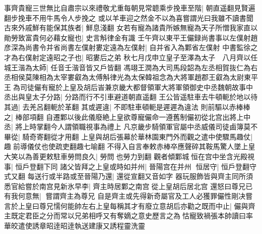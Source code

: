 事齊貴寵三世無比自肅宗以來禮敬尤重每朝見常聼乘步挽車至階|{
	朝直遥翻見賢遍翻步挽車不用牛馬令人步挽之}
或以羊車迎之然金不以為喜嘗謂光曰我雖不讀書聞古來外戚鮮有能保其族者|{
	鮮息淺翻}
女若有寵為諸貴所嫉無寵為天子所憎我家直以勛勞致富貴何必藉女寵也|{
	史言斛律金有識}
壬午齊以東平王儼録尚書事以左僕射趙彦深為尚書令并省尚書左僕射婁定遠為左僕射|{
	自并省入為鄴省左僕射}
中書監徐之才為右僕射定遠昭之子也|{
	昭婁后之弟}
秋七月戊申立皇子至澤為太子　八月齊以任城王湝為太師|{
	任音壬湝音皆又戶皆翻}
馮翊王潤為大司馬段韶為左丞相賀抜仁為右丞相侯莫陳相為太宰婁叡為太傅斛律光為太保韓祖念為大將軍趙郡王叡為太尉東平王為司徒儼有寵於上皇及胡后峕兼京畿大都督領軍大將軍領御史中丞魏朝故事中丞出與皇太子分路|{
	分路而行不引車避道朝直遥翻}
王公皆遥駐車去牛頓軛於地以待其過|{
	去羌呂翻軛於革翻}
其或遲違|{
	不即駐車頓軛是遲遲為違法}
則前驅以赤棒棒之|{
	棒部項翻}
自遷鄴以後此儀廢絶上皇欲尊寵儼命一遵舊制儼初從北宫出將上中丞|{
	將上時掌翻今人謂領職視事為禮上}
凡京畿步騎領軍官屬中丞威儀司徒鹵簿莫不畢從|{
	騎奇寄翻從才用翻}
上皇與胡后張幕於華林園東門外而觀之遣中使驟馬趣仗|{
	趣前導儀仗也使疏吏翻趣七喻翻}
不得入自言奉敕赤棒卒應聲碎其鞍馬驚人墜上皇大笑以為善更敕駐車勞問良久|{
	勞問也勞力到翻}
觀者傾鄴城恒在宫中坐含光殿視事|{
	恒戶登翻下同}
諸父皆拜之上皇或時如并州|{
	晉陽宫在并州}
恒居守|{
	恒戶登翻守式又翻}
每送行或半路或至晉陽乃還|{
	還從宣翻又音如字}
器玩服飾皆與齊主同所須悉官給嘗於南宫見新氷早李|{
	齊主時居鄴之南宫從上皇胡后居北宫}
還怒曰尊兄已有我何意無|{
	嘗謂齊主為尊兄}
自是齊主或先得新奇屬官及工人必獲罪儼性剛决嘗言於上皇曰尊兄懦何能帥左右上皇每稱其才有廢立意胡后亦勸之既而中止|{
	儼與齊主既定君臣之分而常以兄弟相呼又有奪嫡之意史歷言之為怙寵致禍張本帥讀曰率}
華皎遣使誘章昭逹昭逹執送建康又誘程靈洗靈

